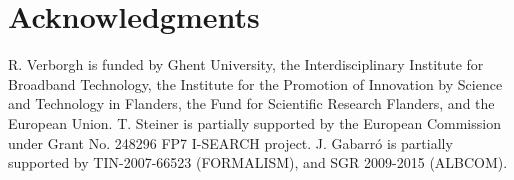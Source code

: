 \documentclass{acm_proc_article-sp}
\begin{document}

\section{Acknowledgments} %
R. Verborgh is funded by Ghent University, the Interdisciplinary Institute for Broadband Technology, the Institute for the Promotion of Innovation by Science and Technology in Flanders, the Fund for Scientific Research Flanders, and the European Union.
T. Steiner is partially supported by the European Commission under Grant No. 248296 FP7 \mbox{I-SEARCH} project.
J. Gabarr\'o is partially supported by TIN-2007-66523 (FORMALISM), and SGR 2009-2015 (\mbox{ALBCOM}).




\balancecolumns
\end{document}

